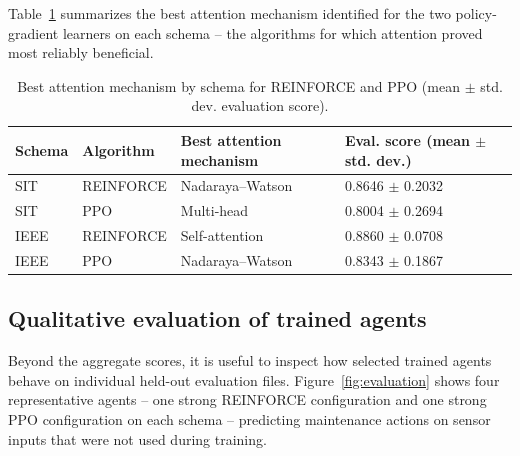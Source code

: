 \documentclass[12pt,oneside]{book}
\begin{document}
Table~\ref{tab:best_mech_ppo_rf} summarizes the best attention mechanism identified for the two policy-gradient learners on each schema -- the algorithms for which attention proved most reliably beneficial.

\begin{table}[htbp]
\centering
	\caption{Best attention mechanism by schema for \textsc{REINFORCE} and \textsc{PPO} (mean $\pm$ std. dev. evaluation score).}
	\label{tab:best_mech_ppo_rf}
	\begin{tabular}{l l l l}
	\toprule
	\textbf{Schema} & \textbf{Algorithm} & \textbf{Best attention mechanism} & \textbf{Eval. score (mean $\pm$ std. dev.)}\\
	\midrule
	SIT & \textsc{REINFORCE} & Nadaraya--Watson & 0.8646 $\pm$ 0.2032\\
	SIT & \textsc{PPO} & Multi-head & 0.8004 $\pm$ 0.2694\\
	IEEE & \textsc{REINFORCE} & Self-attention & 0.8860 $\pm$ 0.0708\\
	IEEE & \textsc{PPO} & Nadaraya--Watson & 0.8343 $\pm$ 0.1867\\
	\bottomrule
	\end{tabular}
\end{table}

\subsection{Qualitative evaluation of trained agents}
Beyond the aggregate scores, it is useful to inspect how selected trained agents behave on individual held-out evaluation files. Figure~\ref{fig:evaluation} shows four representative agents -- one strong \textsc{REINFORCE} configuration and one strong \textsc{PPO} configuration on each schema -- predicting maintenance actions on sensor inputs that were not used during training.
\end{document}
